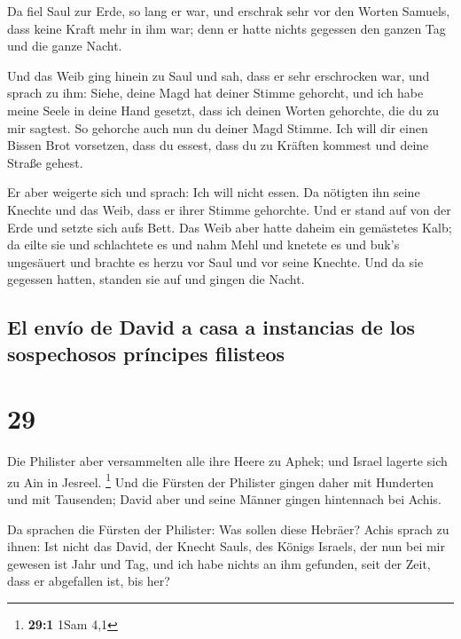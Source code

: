  Da fiel Saul zur Erde, so lang er war, und erschrak sehr
vor den Worten Samuels, dass keine Kraft mehr in ihm war; denn er hatte
nichts gegessen den ganzen Tag und die ganze Nacht.

 Und das Weib ging hinein zu Saul und sah, dass er sehr
erschrocken war, und sprach zu ihm: Siehe, deine Magd hat deiner Stimme
gehorcht, und ich habe meine Seele in deine Hand gesetzt, dass ich
deinen Worten gehorchte, die du zu mir sagtest.  So
gehorche auch nun du deiner Magd Stimme. Ich will dir einen Bissen Brot
vorsetzen, dass du essest, dass du zu Kräften kommest und deine Straße
gehest.

 Er aber weigerte sich und sprach: Ich will nicht essen.
Da nötigten ihn seine Knechte und das Weib, dass er ihrer Stimme
gehorchte. Und er stand auf von der Erde und setzte sich aufs Bett.
 Das Weib aber hatte daheim ein gemästetes Kalb; da eilte
sie und schlachtete es und nahm Mehl und knetete es und buk's ungesäuert
 und brachte es herzu vor Saul und vor seine Knechte. Und
da sie gegessen hatten, standen sie auf und gingen die Nacht.

\hypertarget{el-envuxedo-de-david-a-casa-a-instancias-de-los-sospechosos-pruxedncipes-filisteos}{%
\subsection{El envío de David a casa a instancias de los sospechosos
príncipes
filisteos}\label{el-envuxedo-de-david-a-casa-a-instancias-de-los-sospechosos-pruxedncipes-filisteos}}

\hypertarget{section-28}{%
\section{29}\label{section-28}}

 Die Philister aber versammelten alle ihre Heere zu Aphek;
und Israel lagerte sich zu Ain in Jesreel. \footnote{\textbf{29:1} 1Sam
  4,1}  Und die Fürsten der Philister gingen daher mit
Hunderten und mit Tausenden; David aber und seine Männer gingen
hintennach bei Achis.

 Da sprachen die Fürsten der Philister: Was sollen diese
Hebräer? Achis sprach zu ihnen: Ist nicht das David, der Knecht Sauls,
des Königs Israels, der nun bei mir gewesen ist Jahr und Tag, und ich
habe nichts an ihm gefunden, seit der Zeit, dass er abgefallen ist, bis
her?

